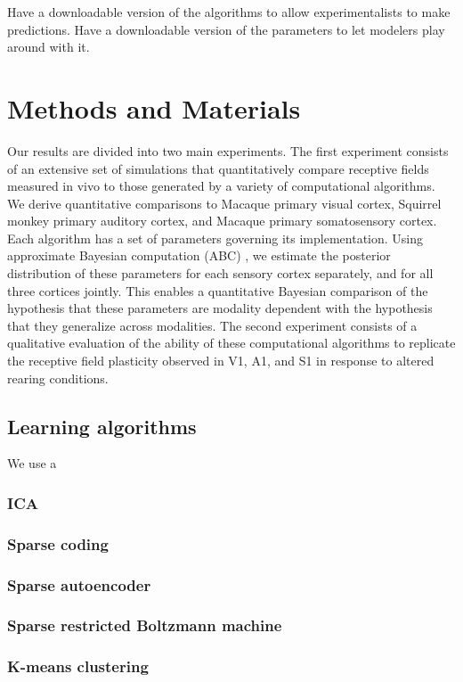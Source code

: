 \documentclass[10pt,letterpaper]{article}
\begin{document}
Have a downloadable version of the algorithms to allow experimentalists to make predictions. Have a downloadable version of the parameters to let modelers play around with it.

\section{Methods and Materials}
Our results are divided into two main experiments. The first experiment consists of an extensive set of simulations that quantitatively compare receptive fields measured in vivo to those generated by a variety of computational algorithms. We derive quantitative comparisons to Macaque primary visual cortex, Squirrel monkey primary auditory cortex, and Macaque primary somatosensory cortex. Each algorithm has a set of parameters governing its implementation. Using approximate Bayesian computation (ABC) \cite{...}, we estimate the posterior distribution of these parameters for each sensory cortex separately, and for all three cortices jointly. This enables a quantitative Bayesian comparison of the hypothesis that these parameters are modality dependent with the hypothesis that they generalize across modalities. The second experiment consists of a qualitative evaluation of the ability of these computational algorithms to replicate the receptive field plasticity observed in V1, A1, and S1 in response to altered rearing conditions.

\subsection{Learning algorithms}
We use a 
\subsubsection{ICA}
\subsubsection{Sparse coding}
\subsubsection{Sparse autoencoder}
\subsubsection{Sparse restricted Boltzmann machine}
\subsubsection{K-means clustering}
\end{document}

